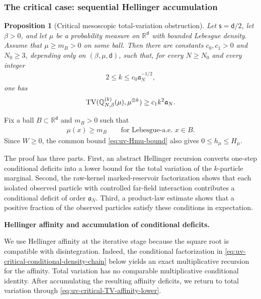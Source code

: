 \documentclass[11pt,reqno]{amsart}
\numberwithin{equation}{section}
\theoremstyle{plain}
\newtheorem{prop}[prop]{Proposition}
\theoremstyle{remark}
\DeclarePairedDelimiter{\pa}{\lparen}{\rparen}
\renewcommand{\d}{\mathsf{d}}
\newcommand{\R}{{\mathbb{R}}}
\newcommand{\Q}{{\mathbb{Q}}}
\newcommand{\be}{\beta}
\newcommand{\s}{\mathsf{s}}
\newcommand{\TV}{\operatorname{TV}}
\newcommand{\parheading}[1]{\par\medskip\noindent\textbf{#1}\ }
\begin{document}
\subsubsection{The critical case: sequential Hellinger accumulation}
\label{subsubsec:uv-critical-mesoscopic}

\begin{prop}[Critical mesoscopic total-variation obstruction]
\label{prop:uv-critical-mesoscopic-TV}
Let \(\s=\d/2\), let \(\be>0\), and let \(\mu\) be a probability measure on \(\R^\d\) with bounded Lebesgue density.  Assume that \(\mu\ge m_B>0\) on some ball.  Then there are constants \(c_0,c_1>0\) and \(N_0\ge3\), depending only on \((\be,\mu,\d)\), such that, for every \(N\ge N_0\) and every integer
\begin{align}\label{eq:uv-critical-k-window}
 2\le k\le c_0\mathfrak a_N^{-1/2},
\end{align}
one has
\begin{align}\label{eq:uv-critical-mesoscopic-TV-lower}
 \TV\pa{\Q_{N,\be}^{(k)}(\mu),\mu^{\otimes k}}
 \ge c_1k^2\mathfrak a_N.
\end{align}
\end{prop}

Fix a ball \(B\subset\R^\d\) and \(m_B>0\) such that
\begin{align}\label{eq:uv-critical-local-density}
 \mu(x)\ge m_B
 \qquad\text{for Lebesgue-a.e. \(x\in B\)}.
\end{align}
Since \(W\ge0\), the common bound \eqref{eq:uv-Hmu-bound} also gives \(0\le h_\mu\le H_\mu\).

The proof has three parts.  First, an abstract Hellinger recursion converts one-step conditional deficits into a lower bound for the total variation of the \(k\)-particle marginal.  Second, the raw-kernel marked-reservoir factorization shows that each isolated observed particle with controlled far-field interaction contributes a conditional deficit of order \(\mathfrak a_N\).  Third, a product-law estimate shows that a positive fraction of the observed particles satisfy these conditions in expectation.

\parheading{Hellinger affinity and accumulation of conditional deficits.}

We use Hellinger affinity at the iterative stage because the square root is compatible with disintegration.  Indeed, the conditional factorization in \eqref{eq:uv-critical-conditional-density-chain} below yields an exact multiplicative recursion for the affinity.  Total variation has no comparable multiplicative conditional identity.  After accumulating the resulting affinity deficits, we return to total variation through \eqref{eq:uv-critical-TV-affinity-lower}.
\end{document}
